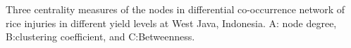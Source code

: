 Three centrality measures of the nodes in differential co-occurrence network of rice injuries in different yield levels at West Java, Indonesia. A: node degree, B:clustering coefficient, and C:Betweenness.
\label{fig:nodepropdifyieldWJ}
